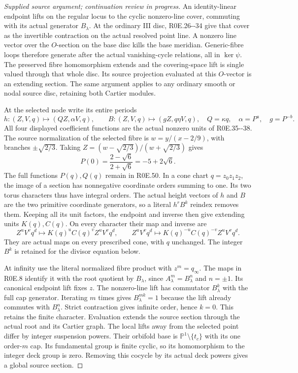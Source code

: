 \begin{proof}[Supplied source argument; continuation review in progress]
An identity-linear endpoint lifts on the regular locus to the cyclic
nonzero-line cover, commuting with its actual generator \(B_\lambda\).
At the ordinary III disc, R0E.26-\/-34 give that cover as the invertible
contraction on the actual resolved point line. A nonzero line vector
over the \(O\)-section on the base disc kills the base meridian.
Generic-fibre loops therefore generate after the actual vanishing-cycle
relations, all in \(\ker\psi\). The preserved fibre homomorphism
extends and the covering-space lift is single valued through that
whole disc. Its source projection evaluated at this \(O\)-vector
is an extending section. The same argument applies to any ordinary
smooth or nodal source disc, retaining both Cartier modules.

At the selected node write its entire periods
\[
 h:(Z,V,q)\mapsto(QZ,\alpha V,q),\qquad
 B:(Z,V,q)\mapsto(gZ,q\eta V,q),\quad
 Q=\kappa q,\quad\alpha=P^a,\quad g=P^{-b}.
 \tag{R0E.50}
\]
All four displayed coefficient functions are the actual nonzero
units of R0E.35-\/-38. The source normalization of the selected fibre
is \(w=y/(x-2/9)\), with branches \(\pm\sqrt{2/3}\). Taking
\(Z=(w-\sqrt{2/3})/(w+\sqrt{2/3})\) gives
\[
             P(0)=\frac{2-\sqrt6}{2+\sqrt6}=-5+2\sqrt6.
 \tag{R0E.51}
\]
The full functions \(P(q),Q(q)\) remain in R0E.50. In a cone chart
\(q=z_0z_1z_2\), the image of a section has nonnegative coordinate
orders summing to one. Its two torus characters thus have integral
orders. The actual height vectors of \(h\) and \(B\) are the two
primitive coordinate generators, so a literal \(h^rB^k\) reindex
removes them. Keeping all its unit factors, the endpoint and inverse
then give extending units \(K(q),C(q)\). On every character their
map and inverse are
\[
 Z^uV^vq^d\mapsto K(q)^uC(q)^v Z^uV^vq^d,
 \qquad Z^uV^vq^d\mapsto K(q)^{-u}C(q)^{-v}Z^uV^vq^d.
 \tag{R0E.52}
\]
They are actual maps on every prescribed cone, with \(q\) unchanged.
The integer \(B^k\) is retained for the divisor equation below.

At infinity use the literal normalized fibre product with
\(z^m=q_\infty\). The maps in R0E.8 identify it with the root
quotient by \(B_\lambda\), since \(A_\lambda^m=B_\lambda^n\)
and \(n=\pm1\). Its canonical endpoint lift fixes \(z\).
The nonzero-line lift has commutator \(B_\lambda^k\) with the full
cap generator. Iterating \(m\) times gives \(B_\lambda^{mk}=1\)
because the lift already commutes with \(B_\lambda^n\). Strict
contraction gives infinite order, hence \(k=0\). This retains the
finite character. Evaluation extends the source section through
the actual root and its Cartier graph. The local lifts away from
the selected point differ by integer suspension powers. Their
orbifold base is \(\mathbb P^1\setminus\{t_c\}\) with its one
order-\(m\) cap. Its fundamental group is finite cyclic, so its
homomorphism to the integer deck group is zero. Removing this
cocycle by its actual deck powers gives a global source section.


\end{proof}

